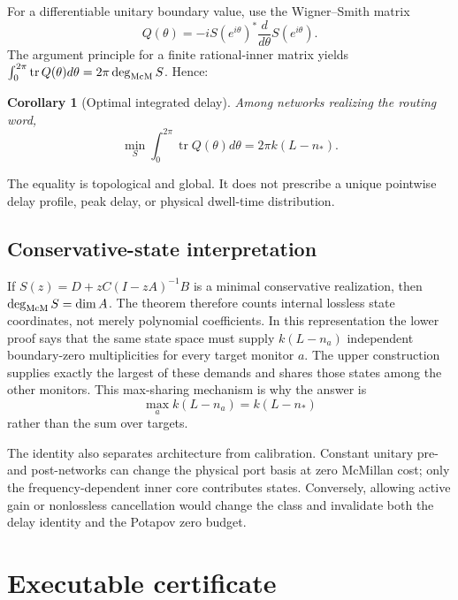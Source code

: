 \documentclass[11pt]{article}
\newtheorem{corollary}[theorem]{Corollary}
\theoremstyle{definition}\newtheorem{definition}[theorem]{Definition}\newtheorem{example}[theorem]{Example}
\theoremstyle{remark}\newtheorem{remark}[theorem]{Remark}\newtheorem{limitation}[theorem]{Limitation}
\begin{document}
For a differentiable unitary boundary value, use the Wigner--Smith matrix
\begin{equation}\label{eq:Q}
                   Q(\theta)=-iS(e^{i\theta})^*\frac{d}{d\theta}S(e^{i\theta}).
\end{equation}
The argument principle for a finite rational-inner matrix yields
$\int_0^{2\pi}\operatorname{tr}Q(\theta)d\theta=2\pi\deg_{\mathrm{McM}} S$.  Hence:

\begin{corollary}[Optimal integrated delay]\label{cor:delay}
Among networks realizing the routing word,
\begin{equation}\label{eq:delay}
 \min_S\int_0^{2\pi}\operatorname{tr}Q(\theta)d\theta
       =2\pi k(L-n_*).
\end{equation}
\end{corollary}

The equality is topological and global.  It does not prescribe a unique
pointwise delay profile, peak delay, or physical dwell-time distribution.

\subsection{Conservative-state interpretation}

If $S(z)=D+zC(I-zA)^{-1}B$ is a minimal conservative realization, then
$\deg_{\mathrm{McM}} S=\dim A$.  The theorem therefore counts internal lossless state
coordinates, not merely polynomial coefficients.  In this representation
the lower proof says that the same state space must supply $k(L-n_a)$
independent boundary-zero multiplicities for every target monitor $a$.
The upper construction supplies exactly the largest of these demands and
shares those states among the other monitors.  This max-sharing mechanism is
why the answer is
\[
                       \max_a k(L-n_a)=k(L-n_*)
\]
rather than the sum over targets.

The identity also separates architecture from calibration.  Constant
unitary pre- and post-networks can change the physical port basis at zero
McMillan cost; only the frequency-dependent inner core contributes states.
Conversely, allowing active gain or nonlossless cancellation would change
the class and invalidate both the delay identity and the Potapov zero
budget.

\section{Executable certificate}
\end{document}
